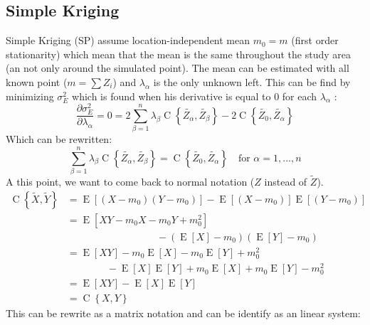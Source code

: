 \documentclass[twocolumn]{article}
\numberwithin{equation}{section}
\begin{document}
\subsection{Simple Kriging}
Simple Kriging (SP) assume location-independent mean $m_0 =m$ (first order stationarity) which mean that the mean is the same throughout the study area (an not only around the simulated point). The mean can be estimated with all known point ($m=\sum Z_i$) and $\lambda_\alpha$ is the only unknown left. This can be find by minimizing $\sigma^2_E$ which is found when his derivative is equal to 0 for each $\lambda_\alpha$ :
\begin{equation}
	\frac{\partial \sigma^2_E}{\partial \lambda_\alpha } = 0=2 \sum_{\beta=1}^n \lambda_\beta \operatorname{C}\left\{\tilde{Z_\alpha},\tilde{Z_\beta}\right\}
	-2 \operatorname{C}\left\{\tilde{Z_0}, \tilde{Z_\alpha}\right\}
\end{equation}
Which can be rewritten:
\begin{equation} \label{eq:minimvar}
	\sum_{\beta=1}^n \lambda_\beta \operatorname{C}\left\{\tilde{Z_\alpha},\tilde{Z_\beta}\right\} = \operatorname{C}\left\{\tilde{Z_0}, \tilde{Z_\alpha}\right\}  \quad \text{for } \alpha=1,...,n
\end{equation}
A this point, we want to come back to normal notation ($Z$ instead of $\tilde{Z}$). 
\begin{align*}
		\operatorname{C}\left\{ \tilde{X},\tilde{Y}\right\} 	&= \operatorname{E}[ (X-m_0)(Y-m_0) ] - \operatorname{E}[(X-m_0)] \operatorname{E}[(Y-m_0)]\\
															&= \operatorname{E}[ XY -m_0X -m_0Y+m_0^2]  \\
															&\quad \quad \quad \quad \quad \quad \quad \quad \quad - ( \operatorname{E}[X] - m_0 )( \operatorname{E}[Y] - m_0 )\\
															&= \operatorname{E}[XY] - m_0\operatorname{E}[X] -m_0 \operatorname{E}[Y] + m_0^2 \\
															&\quad \quad \quad \quad -  \operatorname{E}[X] \operatorname{E}[Y] +m_0 \operatorname{E}[X] + m_0 \operatorname{E}[Y] -m_0^2\\
															&= \operatorname{E}[XY] -  \operatorname{E}[X] \operatorname{E}[Y]\\
															&= \operatorname{C}\left\{ X,Y \right\}
\end{align*}
This can be rewrite as a matrix notation and can be identify as an linear system:
\end{document}
